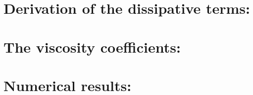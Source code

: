 \section{Derivation of the dissipative terms:}
\section{The viscosity coefficients:}
\section{Numerical results:}
